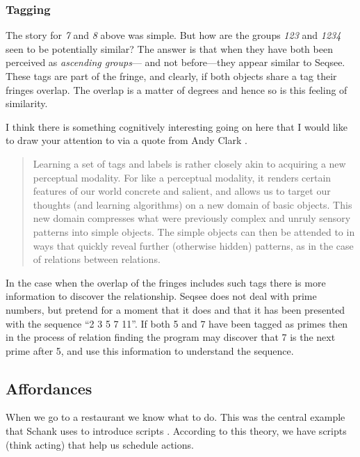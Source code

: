 \documentclass[letterpaper]{article}
\begin{document}
\subsubsection{Tagging}
\label{sec:tagging}

The story for \emph{7} and \emph{8} above was simple.  But how are the groups \emph{123} and \emph{1234} seen to be potentially similar?  The answer is that when they have both been perceived as \emph{ascending groups}--- and not before---they appear similar to Seqsee.  These tags are part of the fringe, and clearly, if both objects share a tag their fringes overlap.  The overlap is a matter of degrees and hence so is this feeling of similarity.

I think there is something cognitively interesting going on here that I would like to draw your attention to via a quote from Andy Clark \cite{Clark:MindWare}.

\begin{quote}
Learning a set of tags and labels is rather closely akin to acquiring a new perceptual modality.  For like a perceptual modality, it renders certain features of our world concrete and salient, and allows us to target our thoughts (and learning algorithms) on a new domain of basic objects.  This new domain compresses what were previously complex and unruly sensory patterns into simple objects.  The simple objects can then be attended to in ways that quickly reveal further (otherwise hidden) patterns, as in the case of relations between relations.
\end{quote}


In the case when the overlap of the fringes includes such tags there is more information to discover the relationship.  Seqsee does not deal with prime numbers, but pretend for a moment that it does and that it has been presented with the sequence ``2 3 5 7 11''. If both 5 and 7 have been tagged as primes then in the process of relation finding the program may discover that 7 is the next prime after 5, and use this information to understand the sequence.


\subsection{Affordances}
\label{sec:affordances}

When we go to a restaurant we know what to do.  This was the central example that Schank uses to introduce scripts \cite{Schank+Abelson}.  According to this theory, we have scripts (think acting) that help us schedule actions. 
\end{document}
